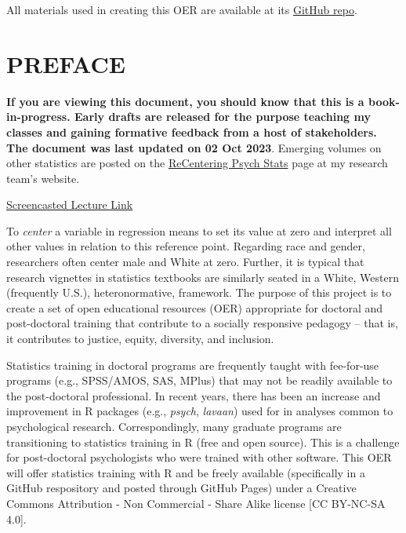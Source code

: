 \documentclass[
  11pt,
]{book}
\begin{document}
All materials used in creating this OER are available at its \href{https://github.com/lhbikos/ReC_MultivModel}{GitHub repo}.

\hypertarget{preface}{%
\chapter*{PREFACE}\label{preface}}


\textbf{If you are viewing this document, you should know that this is a book-in-progress. Early drafts are released for the purpose teaching my classes and gaining formative feedback from a host of stakeholders. The document was last updated on 02 Oct 2023}. Emerging volumes on other statistics are posted on the \href{https://lhbikos.github.io/BikosRVT/ReCenter.html}{ReCentering Psych Stats} page at my research team's website.

\href{https://spu.hosted.panopto.com/Panopto/Pages/Viewer.aspx?id=c932455e-ef06-444a-bdca-acf7012d759a}{Screencasted Lecture Link}

To \emph{center} a variable in regression means to set its value at zero and interpret all other values in relation to this reference point. Regarding race and gender, researchers often center male and White at zero. Further, it is typical that research vignettes in statistics textbooks are similarly seated in a White, Western (frequently U.S.), heteronormative, framework. The purpose of this project is to create a set of open educational resources (OER) appropriate for doctoral and post-doctoral training that contribute to a socially responsive pedagogy -- that is, it contributes to justice, equity, diversity, and inclusion.

Statistics training in doctoral programs are frequently taught with fee-for-use programs (e.g., SPSS/AMOS, SAS, MPlus) that may not be readily available to the post-doctoral professional. In recent years, there has been an increase and improvement in R packages (e.g., \emph{psych}, \emph{lavaan}) used for in analyses common to psychological research. Correspondingly, many graduate programs are transitioning to statistics training in R (free and open source). This is a challenge for post-doctoral psychologists who were trained with other software. This OER will offer statistics training with R and be freely available (specifically in a GitHub respository and posted through GitHub Pages) under a Creative Commons Attribution - Non Commercial - Share Alike license {[}CC BY-NC-SA 4.0{]}.
\end{document}
